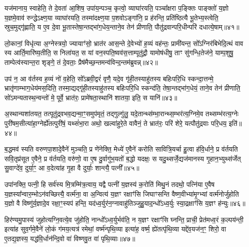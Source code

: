 यज॑मानाय॒ स्वाहेति॒ ते दे॒वता॑ आ॒शिष॒ उपा॑य॒न्पञ्च॒ कृत्वो॒ व्याघा॑रयति॒ पञ्चा᳚क्षरा प॒ङ्क्तिः पाङ्क्तो॑ य॒ज्ञो य॒ज्ञमे॒वाव॑ रुन्द्धे\-ऽक्ष्ण॒या व्याघा॑रयति॒ तस्मा॑दक्ष्ण॒या प॒शवो\-ऽङ्गा॑नि॒ प्र ह॑रन्ति॒ प्रति॑ष्ठित्यै भू॒तेभ्य॒स्त्वेति॒ स्रुच॒मुद्गृ॑ह्णाति॒ य ए॒व दे॒वा भू॒तास्तेषा॒न्तद्भा॑ग॒धेय॒न्ताने॒व तेन॑ प्रीणाति॒ पौतु॑द्रवान्परि॒धीन्परि॑ दधात्ये॒षाम्॥४१॥

लो॒कानां॒ विधृ॑त्या अ॒ग्नेस्त्रयो॒ ज्यायाꣳ॑सो॒ भ्रात॑र आस॒न्ते दे॒वेभ्यो॑ ह॒व्यं वह॑न्तः॒ प्रामी॑यन्त॒ सो᳚\-ऽग्निर॑बिभेदि॒त्थं वाव स्य आर्ति॒मारि॑ष्य॒तीति॒ स निला॑यत॒ स यां वन॒स्पति॒ष्वव॑स॒त्ताम्पूतु॑द्रौ॒ यामोष॑धीषु॒ ताꣳ सु॑गन्धि॒तेज॑ने॒ याम्प॒शुषु॒ ताम्पेत्व॑स्यान्त॒रा शृङ्गे॒ तं दे॒वताः॒ प्रैष॑मैच्छ॒न्तमन्व॑विन्द॒न्तम॑ब्रुवन्न्॥४२॥

उप॑ न॒ आ व॑र्तस्व ह॒व्यं नो॑ व॒हेति॒ सो᳚\-ऽब्रवी॒द्वरं॑ वृणै॒ यदे॒व गृ॑ही॒तस्याहु॑तस्य बहिःपरि॒धि स्कन्दा॒त्तन्मे॒ भ्रातृ॑णाम्भाग॒धेय॑मस॒दिति॒ तस्मा॒द्यद्गृ॑ही॒तस्याहु॑तस्य बहिःपरि॒धि स्कन्द॑ति॒ तेषा॒न्तद्भा॑ग॒धेयं॒ ताने॒व तेन॑ प्रीणाति॒ सो॑\-ऽमन्यतास्थ॒न्वन्तो॑ मे॒ पूर्वे॒ भ्रात॑रः॒ प्रामे॑षता॒स्थानि॑ शातया॒ इति॒ स यानि॑॥४३॥

अ॒स्थान्यशा॑तयत॒ तत्पूतु॑द्र्वभव॒द्यन्मा॒ꣳ॒समुप॑मृतं॒ तद्गुल्गु॑लु॒ यदे॒तान्थ्स॑म्भा॒रान्थ्स॒म्भर॑त्य॒ग्निमे॒व तथ्सम्भ॑रत्य॒ग्नेः पुरी॑षम॒सीत्या॑हा॒ग्नेर्\mbox{}ह्ये॑तत्पुरी॑षं॒ यथ्सं॑भा॒रा अथो॒ खल्वा॑हुरे॒ते वावैनं॒ ते भ्रात॑रः॒ परि॑ शेरे॒ यत्पौतु॑द्रवाः परि॒धय॒ इति॑॥४४॥

{\anuvakamend[{वि॒त्त्वा दे॑वय॒त ए॒षाम॑ब्रुव॒न् यानि॒ चतु॑श्चत्वारिꣳशच्च॥८॥}]}

ब॒द्धमव॑ स्यति वरुणपा॒शादे॒वैने॑ मुञ्चति॒ प्र णे॑नेक्ति॒ मेध्ये॑ ए॒वैने॑ करोति सावित्रि॒यर्चा हु॒त्वा ह॑वि॒र्धाने॒ प्र व॑र्तयति सवि॒तृप्र॑सूत ए॒वैने॒ प्र व॑र्तयति॒ वरु॑णो॒ वा ए॒ष दु॒र्वागु॑भ॒यतो॑ ब॒द्धो यदक्षः॒ स यदु॒थ्सर्जे॒द्यज॑मानस्य गृ॒हान॒भ्युथ्स॑र्जेत् सु॒वाग्दे॑व॒ दुर्या॒ꣳ॒ आ व॒देत्या॑ह गृ॒हा वै दुर्याः॒ शान्त्यै॒ पत्नी᳚॥४५॥

उपा॑नक्ति॒ पत्नी॒ हि सर्व॑स्य मि॒त्रम्मि॑त्र॒त्वाय॒ यद्वै पत्नी॑ य॒ज्ञस्य॑ क॒रोति॑ मिथु॒नं तदथो॒ पत्नि॑या ए॒वैष य॒ज्ञस्या᳚न्वार॒म्भो\-ऽन॑वच्छित्त्यै॒ वर्त्म॑ना॒ वा अ॒न्वित्य॑ य॒ज्ञꣳ रक्षाꣳ॑सि जिघाꣳसन्ति वैष्ण॒वीभ्या॑मृ॒ग्भ्यां वर्त्म॑नोर्जुहोति य॒ज्ञो वै विष्णु॑र्य॒ज्ञादे॒व रक्षा॒ꣳ॒स्यप॑ हन्ति॒ यद॑ध्व॒र्युर॑न॒ग्नावाहु॑तिञ्जुहु॒याद॒न्धो᳚\-ऽध्व॒र्युः स्या॒द्रक्षाꣳ॑सि य॒ज्ञꣳ ह॑न्युः॥४६॥

हिर॑ण्यमु॒पास्य॑ जुहोत्यग्नि॒वत्ये॒व जु॑होति॒ नान्धो᳚\-ऽध्व॒र्युर्भव॑ति॒ न य॒ज्ञꣳ रक्षाꣳ॑सि घ्नन्ति॒ प्राची॒ प्रेत॑मध्व॒रं क॒ल्पय॑न्ती॒ इत्या॑ह सुव॒र्गमे॒वैने॑ लो॒कं ग॑मय॒त्यत्र॑ रमेथां॒ वर्ष्म॑न्पृथि॒व्या इत्या॑ह॒ वर्ष्म॒ ह्ये॑तत्पृ॑थि॒व्या यद्दे॑व॒यज॑न॒ꣳ॒ शिरो॒ वा ए॒तद्य॒ज्ञस्य॒ यद्ध॑वि॒र्धान॑न्दि॒वो वा॑ विष्णवु॒त वा॑ पृथि॒व्याः॥४७॥


